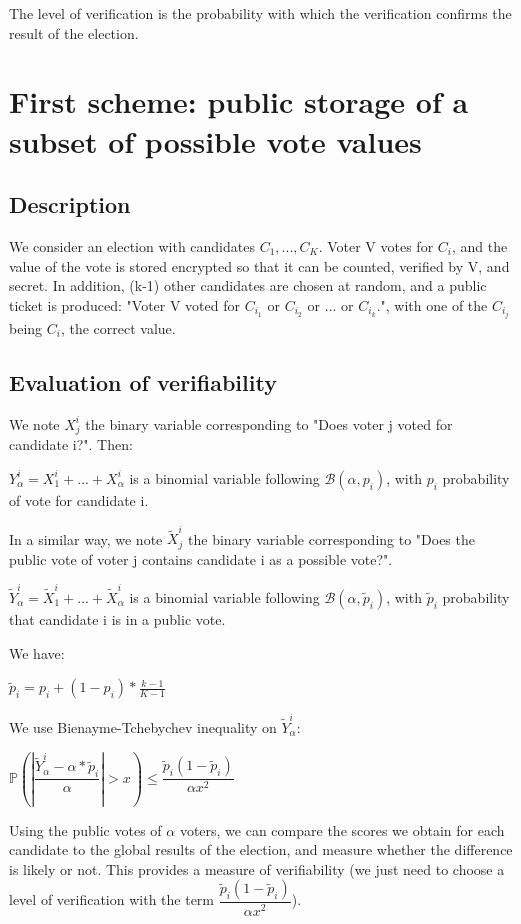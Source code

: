 \documentclass{article}
\begin{document}
The level of verification is the probability with which the verification confirms the result of the election.


\section{First scheme: public storage of a subset of possible vote values}

\subsection{Description}

We consider an election with candidates $C_1, ..., C_K$. Voter V votes for $C_i$, and the value of the vote is stored encrypted so that it can be counted, verified by V, and secret. In addition, (k-1) other candidates are chosen at random, and a public ticket is produced: "Voter V voted for $C_{i_1}$ or $C_{i_2}$ or ... or $C_{i_k}$.", with one of the $C_{i_j}$ being $C_i$, the correct value.

\subsection{Evaluation of verifiability}

We note $X^i_j$ the binary variable corresponding to "Does voter j voted for candidate i?". Then:

$Y_\alpha^i=X^i_1+...+X^i_\alpha$ is a binomial variable following $\mathcal{B}(\alpha, p_i)$, with $p_i$ probability of vote for candidate i.

In a similar way, we note $\tilde{X}^i_j$ the binary variable corresponding to "Does the public vote of voter j contains candidate i as a possible vote?".

$\tilde{Y}_\alpha^i=\tilde{X}^i_1+...+\tilde{X}^i_\alpha$ is a binomial variable following $\mathcal{B}(\alpha, \tilde{p}_i)$, with $\tilde{p}_i$ probability that candidate i is in a public vote.

We have:

$\tilde{p}_i=p_i+(1-p_i)*\frac{k-1}{K-1}$


We use Bienayme-Tchebychev inequality on $\tilde{Y}_\alpha^i$:

$ \mathbb{P}(|\dfrac{\tilde{Y}^i_\alpha-\alpha*\tilde{p}_i}{\alpha}| > x )  \leqslant \dfrac{\tilde{p}_i(1-\tilde{p}_i)}{\alpha x^2}$


Using the public votes of $\alpha$ voters, we can compare the scores we obtain for each candidate to the global results of the election, and measure whether the difference is likely or not. This provides a measure of verifiability (we just need to choose a level of verification with the term $\dfrac{\tilde{p}_i(1-\tilde{p}_i)}{\alpha x^2}$).
\end{document}
